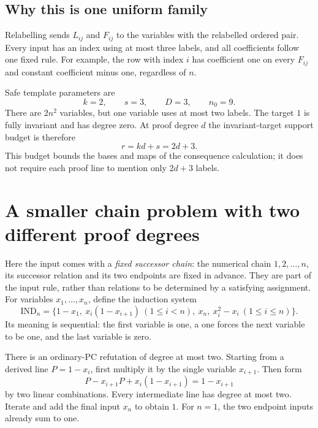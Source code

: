 \documentclass[11pt,a4paper,oneside,openany]{book}
\theoremstyle{definition}\newtheorem{definition}[theorem]{Definition}
\theoremstyle{remark}\newtheorem{remark}[theorem]{Remark}
\numberwithin{equation}{chapter}
\begin{document}
\subsection{Why this is one uniform family}
Relabelling sends $L_{ij}$ and $F_{ij}$ to the variables with the
relabelled ordered pair. Every input has an index using at most three
labels, and all coefficients follow one fixed rule. For example, the
row with index $i$ has coefficient one on every $F_{ij}$ and constant
coefficient minus one, regardless of $n$.

Safe template parameters are
\begin{equation}\label{tx:eq:order-parameters}
                  k=2,\qquad s=3,\qquad D=3,\qquad n_0=9.
\end{equation}
There are $2n^2$ variables, but one variable uses at most two labels.
The target $1$ is fully invariant and has degree zero. At proof degree
$d$ the invariant-target support budget is therefore
\begin{equation}\label{tx:eq:order-support-budget}
                              r=kd+s=2d+3.
\end{equation}
This budget bounds the bases and maps of the consequence calculation;
it does not require each proof line to mention only $2d+3$ labels.

\section{A smaller chain problem with two different proof degrees}
Here the input comes with a \emph{fixed successor chain}: the numerical
chain $1,2,\ldots,n$, its successor relation and its two endpoints
are fixed in advance. They are part of the input rule, rather than
relations to be determined by a satisfying assignment. For variables
$x_1,\ldots,x_n$, define the induction system
\begin{equation}\label{tx:eq:order-induction}
 \mathrm{IND}_n=\{1-x_1,\ x_i(1-x_{i+1})\ (1\le i<n),\ x_n,
                                      \ x_i^2-x_i\ (1\le i\le n)\}.
\end{equation}
Its meaning is sequential: the first variable is one, a one forces the
next variable to be one, and the last variable is zero.

There is an ordinary-PC refutation of degree at most two. Starting
from a derived line $P=1-x_i$, first multiply it by the single variable
$x_{i+1}$. Then form
\[
       P-x_{i+1}P+x_i(1-x_{i+1})=1-x_{i+1}
\]
by two linear combinations. Every intermediate line has degree at
most two. Iterate and add the final input $x_n$ to obtain $1$.
For $n=1$, the two endpoint inputs already sum to one.
\end{document}
